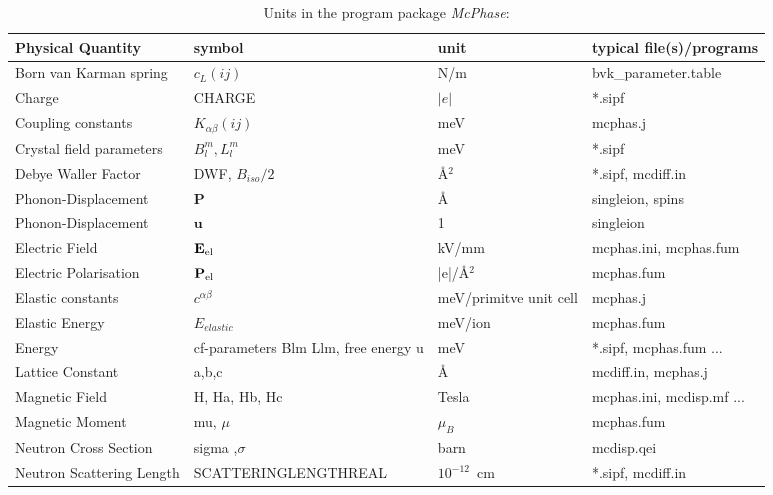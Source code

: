 \documentclass[twoside]{article}
\newcommand{\mbf}[1]{\mathbf #1}
\newcommand{\prg}{\sl}
\begin{document}
\begin{table}[thb] 
\begin{center}  
\caption {Units in the program package 
{\prg McPhase}:}   
\label{units}   
\begin{tabular} 
{l|l|l|l}
Physical Quantity  & symbol                                         & unit      & typical file(s)/programs     \\
\hline
Born van Karman spring & $c_L(ij)$                                  &  N/m      &   bvk\_parameter.table  \\
Charge             &  CHARGE                                        & $|e|$     & *.sipf \\
Coupling constants & $K_{\alpha\beta}(ij)$                          & meV       & mcphas.j     \\
Crystal field parameters & $B_l^m, L_l^m$			    & meV	& *.sipf \\
Debye Waller Factor & DWF, $B_{iso}/2$                              & \AA$^2$   & *.sipf, mcdiff.in \\ 
Phonon-Displacement	   & $\mbf P$                               & \AA       & singleion, spins   \\
Phonon-Displacement	   & $\mbf u$                               & 1         & singleion   \\
Electric Field	   & $\mbf E_{\rm el}$				    & kV/mm     & mcphas.ini, mcphas.fum \\
Electric Polarisation & $\mbf P_{\rm el}$			    & |e|/\AA$^2$ & mcphas.fum \\
Elastic constants  &  $c^{\alpha\beta} $			    & meV/primitve unit cell & mcphas.j \\
Elastic Energy     &  $E_{elastic}$				    & meV/ion	& mcphas.fum \\
Energy             & cf-parameters Blm Llm, free energy u           & meV       & *.sipf, mcphas.fum ...  \\
Lattice Constant   & a,b,c                                          & \AA        & mcdiff.in, mcphas.j \\
Magnetic Field     & H, Ha, Hb, Hc                                  & Tesla     & mcphas.ini, mcdisp.mf ...    \\
Magnetic Moment    &  mu, $\mu$                                     & $\mu_B$   & mcphas.fum \\
Neutron Cross Section &  sigma ,$\sigma$                            & barn      & mcdisp.qei \\
Neutron Scattering Length & SCATTERINGLENGTHREAL & $10^{-12}$~cm & *.sipf, mcdiff.in \\

\end{tabular}
\end{center}
\end{table}
\end{document}
